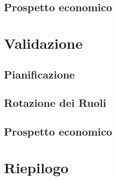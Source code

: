 \documentclass[12pt,a4paper]{article}
\begin{document}
\subsection{Prospetto economico}

\newpage
\section{Validazione} %

\subsection{Pianificazione}

\subsection{Rotazione dei Ruoli}

\subsection{Prospetto economico}


\newpage
\section{Riepilogo}
\end{document}
